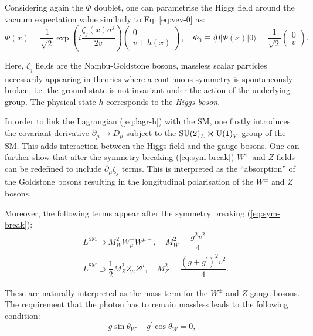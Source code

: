 Considering again the $\Phi$ doublet, one can parametrise the Higgs field around the vacuum expectation value similarly to Eq. \ref{eq:vev-0} as:
\begin{equation}\label{eq:sym-break}
    \Phi(x) = \dfrac{1}{\sqrt{2}}\exp\left(i\dfrac{\zeta_j(x)\sigma^j}{2v}\right)\left(\begin{matrix}0 \\ v + h(x)\end{matrix}\right), \quad \Phi_0 \equiv \langle 0 | \Phi(x) | 0 \rangle = \dfrac{1}{\sqrt{2}}\left(\begin{matrix}0 \\ v \end{matrix}\right).
\end{equation}

Here, $\zeta_j$ fields are the Nambu-Goldstone bosons, massless scalar particles necessarily appearing in theories where a continuous symmetry is spontaneously broken, i.e. the ground state is not invariant under the action of the underlying group. The physical state $h$ corresponds to the \textit{Higgs boson}.

In order to link the Lagrangian (\ref{eq:lagr-h}) with the SM, one firstly introduces the covariant derivative $\partial_\mu \to D_\mu$ subject to the $\text{SU(2)}_L \cross \text{U(1)}_Y$ group of the SM. This adds interaction between the Higgs field and the gauge bosons. One can further show that after the symmetry breaking (\ref{eq:sym-break}) $W^\pm$ and $Z$ fields can be redefined to include $\partial_\mu\zeta_j$ terms. This is interpreted as the \enquote{absorption} of the Goldstone bosons resulting in the longitudinal polarisation of the $W^\pm$ and $Z$ bosons.

Moreover, the following terms appear after the symmetry breaking (\ref{eq:sym-break}):
\begin{align}
    &L^\text{SM} \supset M_W^2W_\mu^+ W^{\mu-}, \quad M_W^2 = \dfrac{g^2v^2}{4}\\
    &L^\text{SM} \supset \dfrac{1}{2}M_Z^2 Z_\mu Z^{\mu}, \quad M_Z^2 = \dfrac{(g+g^\prime)^2v^2}{4}.
\end{align}

These are naturally interpreted as the mass term for the $W^\pm$ and $Z$ gauge bosons. The requirement that the photon has to remain massless leads to the following condition:
\begin{equation}
    g\sin\theta_W - g^\prime\cos\theta_W = 0,
\end{equation}


